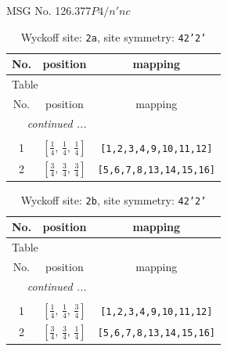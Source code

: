 \documentclass[fleqn,8pt]{jsarticle}
\begin{document}
\setcounter{MaxMatrixCols}{32}

\renewcommand{\tablename}{Table~}
\renewcommand{\figurename}{Figure~}
\begin{center}
\LARGE
MSG No. 126.377\quad$P4/n'nc$
\end{center}
\renewcommand{\arraystretch}{1.2}
\begin{longtable}{ccc}
\caption{Wyckoff site: {\tt 2a}, site symmetry: {\tt 42'2'}}
 \\
 \hline \hline
No. & position & mapping \\ \hline \endfirsthead

\multicolumn{2}{l}{\tablename\ \thetable{}} \\
 \hline \hline
No. & position & mapping \\ \hline \endhead

 \hline \hline
\multicolumn{2}{r}{\footnotesize\it continued ...} \\ \endfoot

 \hline \hline
\multicolumn{2}{r}{} \\ \endlastfoot

1 & $\left[ \frac{1}{4},\, \frac{1}{4},\, \frac{1}{4} \right]$ & {\tt [1,2,3,4,9,10,11,12]} \\ \hline
2 & $\left[ \frac{3}{4},\, \frac{3}{4},\, \frac{3}{4} \right]$ & {\tt [5,6,7,8,13,14,15,16]} \\
\end{longtable}
\renewcommand{\arraystretch}{1.2}
\begin{longtable}{ccc}
\caption{Wyckoff site: {\tt 2b}, site symmetry: {\tt 42'2'}}
 \\
 \hline \hline
No. & position & mapping \\ \hline \endfirsthead

\multicolumn{2}{l}{\tablename\ \thetable{}} \\
 \hline \hline
No. & position & mapping \\ \hline \endhead

 \hline \hline
\multicolumn{2}{r}{\footnotesize\it continued ...} \\ \endfoot

 \hline \hline
\multicolumn{2}{r}{} \\ \endlastfoot

1 & $\left[ \frac{1}{4},\, \frac{1}{4},\, \frac{3}{4} \right]$ & {\tt [1,2,3,4,9,10,11,12]} \\ \hline
2 & $\left[ \frac{3}{4},\, \frac{3}{4},\, \frac{1}{4} \right]$ & {\tt [5,6,7,8,13,14,15,16]} \\
\end{longtable}
\end{document}
